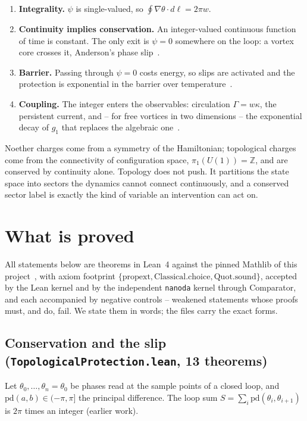 \documentclass[11pt,a4paper]{article}
\newcommand{\lean}[1]{\texttt{\small #1}}
\begin{document}
\begin{enumerate}[leftmargin=*]
\item \textbf{Integrality.} $\psi$ is single-valued, so $\oint\nabla\theta\cdot d\ell=2\pi w$.
\item \textbf{Continuity implies conservation.} An integer-valued continuous function of time is
  constant. The only exit is $\psi=0$ somewhere on the loop: a vortex core crosses it, Anderson's
  phase slip~\cite{Anderson1966}.
\item \textbf{Barrier.} Passing through $\psi=0$ costs energy, so slips are activated and the
  protection is exponential in the barrier over
  temperature~\cite{LangerFisher1967}.
\item \textbf{Coupling.} The integer enters the observables: circulation $\Gamma=w\kappa$, the
  persistent current, and -- for free vortices in two dimensions -- the exponential decay of
  $g_1$ that replaces the algebraic one~\cite{KosterlitzThouless1973,NelsonKosterlitz1977}.
\end{enumerate}
Noether charges come from a symmetry of the Hamiltonian; topological charges come from the
connectivity of configuration space, $\pi_1(U(1))=\mathbb Z$, and are conserved by continuity alone.
Topology does not push. It partitions the state space into sectors the dynamics cannot connect
continuously, and a conserved sector label is exactly the kind of variable an intervention can act on.

\section{What is proved}\label{sec:theorems}

All statements below are theorems in Lean~4 against the pinned Mathlib of this
project~\cite{Callens2026Lean}, with axiom footprint $\{\mathrm{propext},
\mathrm{Classical.choice}, \mathrm{Quot.sound}\}$, accepted by the Lean kernel and by the independent
\lean{nanoda} kernel through Comparator, and each accompanied by negative controls -- weakened
statements whose proofs must, and do, fail. We state them in words; the files carry the exact forms.

\subsection{Conservation and the slip (\lean{TopologicalProtection.lean}, 13 theorems)}

Let $\theta_0,\dots,\theta_n=\theta_0$ be phases read at the sample points of a closed loop, and
$\mathrm{pd}(a,b)\in(-\pi,\pi]$ the principal difference. The loop sum
$S=\sum_i\mathrm{pd}(\theta_i,\theta_{i+1})$ is $2\pi$ times an integer (earlier work).
\end{document}
